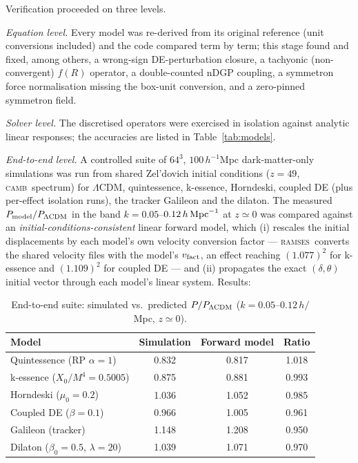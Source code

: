 \documentclass[11pt,a4paper]{article}
\newcommand{\ramses}{\textsc{ramses}}
\newcommand{\camb}{\textsc{camb}}
\begin{document}
Verification proceeded on three levels.

\emph{Equation level.} Every model was re-derived from its
original reference (unit conversions included) and the code
compared term by term; this stage found and fixed, among others, a
wrong-sign DE-perturbation closure, a tachyonic (non-convergent)
$f(R)$ operator, a double-counted nDGP coupling, a symmetron
force normalisation missing the box-unit conversion, and a
zero-pinned symmetron field.

\emph{Solver level.} The discretised operators were exercised in
isolation against analytic linear responses; the accuracies are
listed in Table~\ref{tab:models}.

\emph{End-to-end level.} A controlled suite of $64^3$, $100\,
h^{-1}$Mpc dark-matter-only simulations was run from shared
Zel'dovich initial conditions ($z=49$, \camb\ spectrum) for
$\Lambda$CDM, quintessence, k-essence, Horndeski, coupled DE (plus
per-effect isolation runs), the tracker Galileon and the dilaton.
The measured $P_{\rm model}/P_{\Lambda{\rm CDM}}$ in the band
$k=0.05$--$0.12\,h\,{\rm Mpc}^{-1}$ at $z\simeq0$ was compared
against an \emph{initial-conditions-consistent} linear forward
model, which (i) rescales the initial displacements by each
model's own velocity conversion factor --- \ramses\ converts the
shared velocity files with the model's $v_{\rm fact}$, an effect
reaching $(1.077)^2$ for k-essence and $(1.109)^2$ for coupled DE
--- and (ii) propagates the exact $(\delta,\theta)$ initial vector
through each model's linear system. Results:

\begin{table}
\centering
\caption{End-to-end suite: simulated vs.\ predicted
$P/P_{\Lambda\rm CDM}$ ($k=0.05$--$0.12\,h/$Mpc, $z\simeq0$).}
\label{tab:sims}
\begin{tabular}{lccc}
\toprule
Model & Simulation & Forward model & Ratio \\
\midrule
Quintessence (RP $\alpha{=}1$) & 0.832 & 0.817 & 1.018 \\
k-essence ($X_0/M^4{=}0.5005$) & 0.875 & 0.881 & 0.993 \\
Horndeski ($\mu_0{=}0.2$)      & 1.036 & 1.052 & 0.985 \\
Coupled DE ($\beta{=}0.1$)     & 0.966 & 1.005 & 0.961 \\
Galileon (tracker)             & 1.148 & 1.208 & 0.950 \\
Dilaton ($\beta_0{=}0.5$, $\lambda{=}20$) & 1.039 & 1.071 & 0.970 \\
\bottomrule
\end{tabular}
\end{table}
\end{document}
